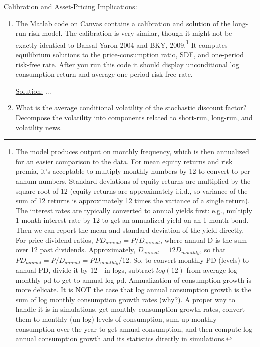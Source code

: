 \documentclass{article}
\begin{document}
\pagebreak

Calibration and Asset-Pricing Implications:

\begin{enumerate}

\item The Matlab code on Canvas contains a calibration and solution of the long-run risk model. The calibration is very similar, though it might not be exactly identical to Bansal Yaron 2004 and BKY, 2009.\footnote{The model produces output on monthly frequency, which is then annualized for an easier comparison to the data. For mean equity returns and risk premia, it’s acceptable to multiply monthly numbers by 12 to convert to per annum numbers. Standard deviations of equity returns are multiplied by the square root of 12 (equity returns are approximately i.i.d., so variance of the sum of 12 returns is approximately 12 times the variance of a single return). The interest rates are typically converted to annual yields first: e.g., multiply 1-month interest rate by 12 to get an annualized yield on an 1-month bond. Then we can report the mean and standard deviation of the yield directly. For price-dividend ratios, $PD_{annual} = P/D_{annual}$, where annual D is the sum over 12 past dividends. Approximately, $D_{annual} = 12D_{monthly}$, so that $PD_{annual} = P/D_{annual} = PD_{monthly}/12$. So, to convert monthly PD (levels) to annual PD, divide it by 12 - in logs, subtract $log(12)$ from average log monthly pd to get to annual log pd. Annualization of consumption growth is more delicate. It is NOT the case that log annual consumption growth is the sum of log monthly consumption growth rates (why?). A proper way to handle it is in simulations, get monthly consumption growth rates, convert them to monthly (un-log) levels of consumption, sum up monthly consumption over the year to get annual consumption, and then compute log annual consumption growth and its statistics directly in simulations.} It computes equilibrium solutions to the price-consumption ratio, SDF, and one-period risk-free rate. After you run this code it should display unconditional log consumption return and average one-period risk-free rate.

\bigskip

\underline{Solution:}  ...

\bigskip

\item  What is the average conditional volatility of the stochastic discount factor? Decompose the volatility into components related to short-run, long-run, and volatility news.


\end{enumerate}
\end{document}
